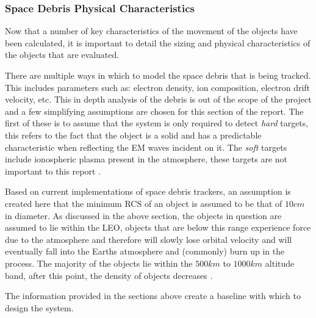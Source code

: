 \documentclass[11pt]{witseiepaper}
\begin{document}
\subsubsection{Space Debris Physical Characteristics} \label{sec:SpaceDebrisPhysicalCharacteristics}
Now that a number of key characteristics of the movement of the objects have been calculated, it is important to detail the sizing and physical characteristics of the objects that are evaluated.

There are multiple ways in which to model the space debris that is being tracked. This includes parameters such as: electron density, ion composition, electron drift velocity, etc. This in depth analysis of the debris is out of the scope of the project and a few simplifying assumptions are chosen for this section of the report.
The first of these is to assume that the system is only required to detect \textit{hard} targets, this refers to the fact that the object is a solid and has a predictable characteristic when reflecting the EM waves incident on it. The \textit{soft} targets include ionospheric plasma present in the atmosphere, these targets are not important to this report \cite{softTarget}.  

Based on current implementations of space debris trackers, an assumption is created here that the minimum RCS of an object is assumed to be that of $10 cm$ in diameter.
As discussed in the above section, the objects in question are assumed to lie within the LEO, objects that are below this range experience force due to the atmosphere and therefore will slowly lose orbital velocity and will eventually fall into the Earths atmosphere and (commonly) burn up in the process.
The majority of the objects lie within the $500 km$ to $1000 km$ altitude band, after this point, the density of objects decreases \cite{ObjectInformation}. 

The information provided in the sections above create a baseline with which to design the system.



\end{document}

